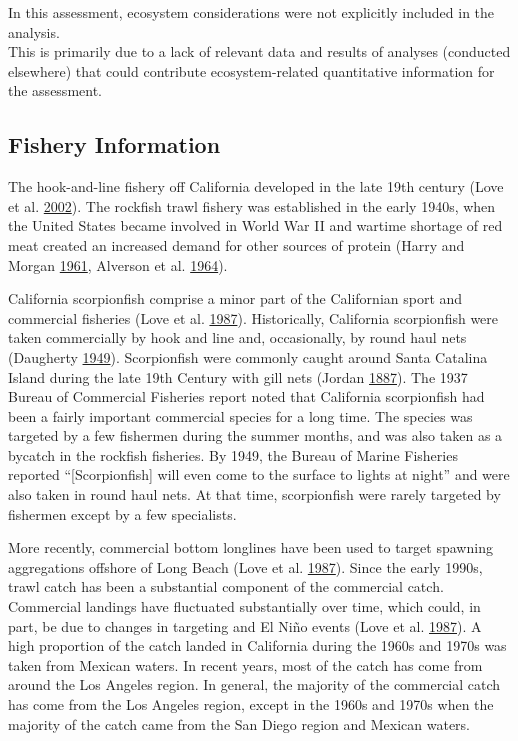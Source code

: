 \documentclass[12pt,]{article}
\begin{document}
In this assessment, ecosystem considerations were not explicitly
included in the analysis.\\
This is primarily due to a lack of relevant data and results of analyses
(conducted elsewhere) that could contribute ecosystem-related
quantitative information for the assessment.

\subsection{Fishery Information}\label{fishery-information}

The hook-and-line fishery off California developed in the late 19th
century (Love et al. \protect\hyperlink{ref-Love2002}{2002}). The
rockfish trawl fishery was established in the early 1940s, when the
United States became involved in World War II and wartime shortage of
red meat created an increased demand for other sources of protein (Harry
and Morgan \protect\hyperlink{ref-Harry1961}{1961}, Alverson et al.
\protect\hyperlink{ref-Alverson1964}{1964}).

California scorpionfish comprise a minor part of the Californian sport
and commercial fisheries (Love et al.
\protect\hyperlink{ref-Love1987}{1987}). Historically, California
scorpionfish were taken commercially by hook and line and, occasionally,
by round haul nets (Daugherty
\protect\hyperlink{ref-Daugherty1949}{1949}). Scorpionfish were commonly
caught around Santa Catalina Island during the late 19th Century with
gill nets (Jordan \protect\hyperlink{ref-Jordan1887}{1887}). The 1937
Bureau of Commercial Fisheries report noted that California scorpionfish
had been a fairly important commercial species for a long time. The
species was targeted by a few fishermen during the summer months, and
was also taken as a bycatch in the rockfish fisheries. By 1949, the
Bureau of Marine Fisheries reported ``{[}Scorpionfish{]} will even come
to the surface to lights at night'' and were also taken in round haul
nets. At that time, scorpionfish were rarely targeted by fishermen
except by a few specialists.

More recently, commercial bottom longlines have been used to target
spawning aggregations offshore of Long Beach (Love et al.
\protect\hyperlink{ref-Love1987}{1987}). Since the early 1990s, trawl
catch has been a substantial component of the commercial catch.
Commercial landings have fluctuated substantially over time, which
could, in part, be due to changes in targeting and El
\(\text{Ni\~{n}o}\) events (Love et al.
\protect\hyperlink{ref-Love1987}{1987}). A high proportion of the catch
landed in California during the 1960s and 1970s was taken from Mexican
waters. In recent years, most of the catch has come from around the Los
Angeles region. In general, the majority of the commercial catch has
come from the Los Angeles region, except in the 1960s and 1970s when the
majority of the catch came from the San Diego region and Mexican waters.
\end{document}
